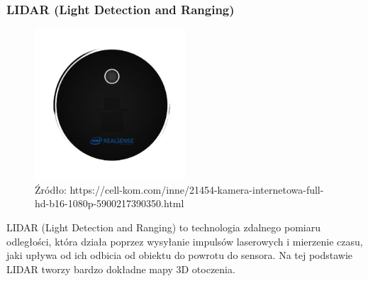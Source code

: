 \documentclass[magisterska]{pracadypl}
\begin{document}
\subsubsection{LIDAR (Light Detection and Ranging)}

\begin{figure}[h]  %
    \centering  %
    \includegraphics[width=0.5\textwidth]{images/LIDAR.png}  %
    \captionsetup{labelformat=empty, font=footnotesize}
    \caption{Źródło: https://cell-kom.com/inne/21454-kamera-internetowa-full-hd-b16-1080p-5900217390350.html}
    \label{fig:mono}  %
\end{figure}

LIDAR (Light Detection and Ranging) to technologia zdalnego pomiaru odległości, która działa poprzez wysyłanie impulsów laserowych i mierzenie czasu, jaki upływa od ich odbicia od obiektu do powrotu do sensora. Na tej podstawie LIDAR tworzy bardzo dokładne mapy 3D otoczenia.
\end{document}
